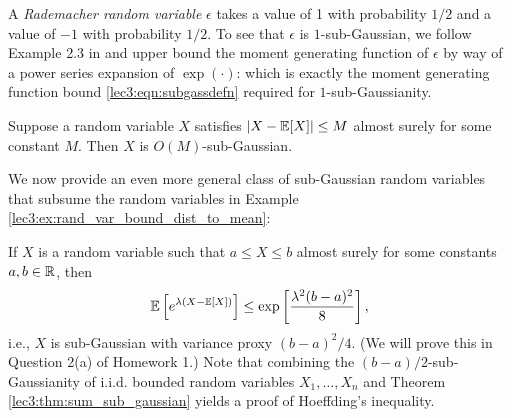 \begin{example}
    A \textit{Rademacher random variable} $\epsilon$ takes a value of 1 with probability $1/2$ and a value of $-1$ with probability $1/2$. To see that $\epsilon$ is $1$-sub-Gaussian, we follow Example 2.3 in \cite{wainwright2019high} and upper bound the moment generating function of $\epsilon$ by way of a power series expansion of $\exp(\cdot)$:
    which is exactly the moment generating function bound \eqref{lec3:eqn:subgassdefn} required for $1$-sub-Gaussianity.
\end{example}

\begin{example}\label{lec3:ex:rand_var_bound_dist_to_mean}
    Suppose a random variable $X$ satisfies $|X - \operatorname*{\mathbb{E}}[X]| \leq M$ almost surely for some constant $M$. Then $X$ is $O(M)$-sub-Gaussian.
\end{example}
We now provide an even more general class of sub-Gaussian random variables that subsume the random variables in Example \ref{lec3:ex:rand_var_bound_dist_to_mean}:
\begin{example}
    \label{lec3:ex:bounded_rand_var_subg}
    If $X$ is a random variable such that $a \leq X \leq b$ almost surely for some constants $a, b \in \mathbb R$, then
    \begin{equation*}
        \operatorname*{\mathbb{E}}\left[e^{\lambda(X - \operatorname*{\mathbb{E}}[X])}\right] \leq \exp \left[ \frac{\lambda^2(b - a)^2}{8} \right],
    \end{equation*}
    i.e., $X$ is sub-Gaussian with variance proxy $(b - a)^2/4$. (We will prove this in Question 2(a) of Homework 1.) Note that combining the $(b - a)/2$-sub-Gaussianity of i.i.d. bounded random variables $X_1, \dotsc, X_n$ and Theorem \ref{lec3:thm:sum_sub_gaussian} yields a proof of Hoeffding's inequality.
\end{example}

